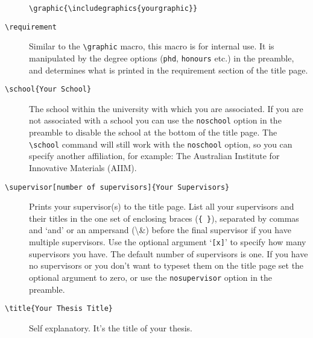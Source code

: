 \documentclass[12pt,oneside]{article}
\newcommand{\option}[1]{\texttt{\color{Green}#1}} %
\newcommand{\command}[1]{\texttt{\color{Red}#1}} %
\newcommand{\comoptions}[1]{\texttt{\color{Blue}#1}} %
\begin{document}
\begin{description}
    \command{\textbackslash{}graphic}\comoptions{\{\textbackslash{}includegraphics\{yourgraphic\}\}}
    
    \item[\command{\textbackslash{}requirement}] Similar to the \command{\textbackslash{}graphic} macro, this macro is for internal use. It is manipulated by the degree options (\option{phd}, \option{honours} etc.) in the preamble, and determines what is printed in the requirement section of the title page.
    
    \item[\command{\textbackslash{}school}\comoptions{\{Your School\}}] The school within the university with which you are associated. If you are not associated with a school you can use the \option{noschool} option in the preamble to disable the school at the bottom of the title page. The \option{\textbackslash{}school} command will still work with the \option{noschool} option, so you can specify another affiliation, for example: The Australian Institute for Innovative Materials (AIIM).
    
    \item[\command{\textbackslash{}supervisor}\option{[number of supervisors]}\comoptions{\{Your Supervisors\}}] Prints your supervisor(s) to the title page. List all your supervisors and their titles in the one set of enclosing braces (\comoptions{\{~\}}), separated by commas and `and' or an ampersand (\textbackslash{}\&) before the final supervisor if you have multiple supervisors. Use the optional argument `\option{[x]}' to specify how many supervisors you have. The default number of supervisors is one. If you have no supervisors or you don't want to typeset them on the title page set the optional argument to zero, or use the \option{nosupervisor} option in the preamble.
    
    \item[\command{\textbackslash{}title}\comoptions{\{Your Thesis Title\}}] Self explanatory. It's the title of your thesis.
\end{description}
\end{document}
